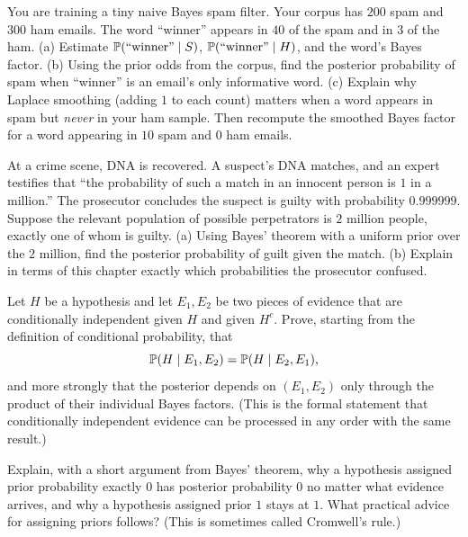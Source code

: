 \begin{exercise}
\label{ch05:exer-naive-bayes}
You are training a tiny naive Bayes spam filter. Your corpus has $200$ spam and $300$ ham
emails. The word ``winner'' appears in $40$ of the spam and in $3$ of the ham.
(a) Estimate $\operatorname{\mathbb{P}}(\text{``winner''}\mid S)$, $\operatorname{\mathbb{P}}(\text{``winner''}\mid H)$, and the
word's Bayes factor. (b) Using the prior odds from the corpus, find the posterior
probability of spam when ``winner'' is an email's only informative word. (c) Explain
why Laplace smoothing (adding $1$ to each count) matters when a word appears in spam but
\emph{never} in your ham sample. Then recompute the smoothed Bayes factor for a word
appearing in $10$ spam and $0$ ham emails.
\end{exercise}

\begin{exercise}
\label{ch05:exer-prosecutor}
At a crime scene, DNA is recovered. A suspect's DNA matches, and an expert testifies that
``the probability of such a match in an innocent person is $1$ in a million.'' The
prosecutor concludes the suspect is guilty with probability $0.999999$. Suppose the
relevant population of possible perpetrators is $2$ million people, exactly one of whom is
guilty. (a) Using Bayes' theorem with a uniform prior over the $2$ million, find the
posterior probability of guilt given the match. (b) Explain in terms of this chapter
exactly which probabilities the prosecutor confused.
\end{exercise}

\begin{exercise}
\label{ch05:exer-order}
Let $H$ be a hypothesis and let $E_1, E_2$ be two pieces of evidence that are
conditionally independent given $H$ and given $H^c$. Prove, starting from the definition of
conditional probability, that
\[
  \operatorname{\mathbb{P}}(H\mid E_1, E_2) = \operatorname{\mathbb{P}}(H \mid E_2, E_1),
\]
and more strongly that the posterior depends on $(E_1,E_2)$ only through the product of
their individual Bayes factors. (This is the formal statement that conditionally
independent evidence can be processed in any order with the same result.)
\end{exercise}

\begin{exercise}
\label{ch05:exer-cromwell}
Explain, with a short argument from Bayes' theorem, why a hypothesis assigned prior
probability exactly $0$ has posterior probability $0$ no matter what evidence arrives, and
why a hypothesis assigned prior $1$ stays at $1$. What practical advice for assigning
priors follows? (This is sometimes called Cromwell's rule.)
\end{exercise}

